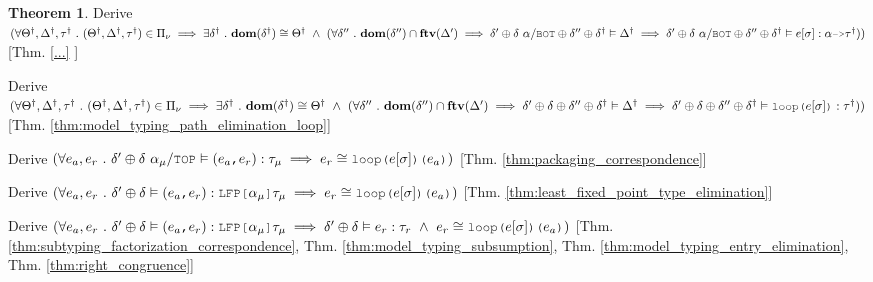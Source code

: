 \documentclass[acmsmall]{acmart}
\theoremstyle{definition}
\newtheorem{theorem}{Theorem}[section]
\begin{document}
\begin{theorem}
  \item \I\I \N Derive $(
    \forall \Theta^\dagger, \Delta^\dagger, \tau^\dagger \qua 
    (\Theta^\dagger, \Delta^\dagger, \tau^\dagger) \in \Pi_\nu \implies
    \exists \delta^\dagger \qua \textbf{dom}(\delta^\dagger) \cong \Theta^\dagger \up 
    (
    \forall \delta'' \qua
    \textbf{dom}(\delta'') \cap \textbf{ftv}(\Delta') \implies
    \delta' \oplus \delta\ \alpha \slash \J{BOT} \oplus \delta'' \oplus \delta^\dagger \satisfies \Delta^\dagger \implies
    \delta' \oplus \delta\ \alpha \slash \J{BOT} \oplus \delta'' \oplus \delta^\dagger \satisfies e[\sigma] \hastype \alpha \J{->} \tau^\dagger
    )
  )$ [Thm. \ref{...} ]

  \item \I\I \N Derive $(
    \forall \Theta^\dagger, \Delta^\dagger, \tau^\dagger \qua 
    (\Theta^\dagger, \Delta^\dagger, \tau^\dagger) \in \Pi_\nu \implies
    \exists \delta^\dagger \qua \textbf{dom}(\delta^\dagger) \cong \Theta^\dagger \up 
    (
    \forall \delta'' \qua
    \textbf{dom}(\delta'') \cap \textbf{ftv}(\Delta') \implies
    \delta' \oplus \delta \oplus \delta'' \oplus \delta^\dagger \satisfies \Delta^\dagger \implies
    \delta' \oplus \delta \oplus \delta'' \oplus \delta^\dagger \satisfies \J{loop(}e[\sigma]\J{)} \hastype \tau^\dagger
    )
  )$ [Thm. \ref{thm:model_typing_path_elimination_loop}]

  \item \I\I \N Derive $(
    \forall e_a, e_r \qua 
    \delta' \oplus \delta\ \alpha_\mu \slash \J{TOP} \satisfies (e_a\J{,}e_r) \hastype \tau_\mu
    \implies 
    e_r \cong \J{loop(}e[\sigma]\J{)(} e_a \J{)}
  )$ [Thm. \ref{thm:packaging_correspondence}]

  \item \I\I \N Derive $(
    \forall e_a, e_r \qua 
    \delta' \oplus \delta \satisfies (e_a\J{,}e_r) \hastype \J{LFP[}\alpha_\mu\J{]}\tau_\mu
    \implies 
    e_r \cong \J{loop(}e[\sigma]\J{)(} e_a \J{)}
  )$ [Thm. \ref{thm:least_fixed_point_type_elimination}]

  \item \I\I \N Derive $(
    \forall e_a, e_r \qua 
    \delta' \oplus \delta \satisfies (e_a\J{,}e_r) \hastype \J{LFP[}\alpha_\mu\J{]}\tau_\mu
    \implies 
    \delta' \oplus \delta \satisfies e_r \hastype \tau_r 
    \up
    e_r \cong \J{loop(}e[\sigma]\J{)(} e_a \J{)}
  )$ [Thm. \ref{thm:subtyping_factorization_correspondence},
      Thm. \ref{thm:model_typing_subsumption},
      Thm. \ref{thm:model_typing_entry_elimination},
      Thm. \ref{thm:right_congruence}]


\end{theorem}
\end{document}
